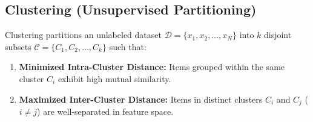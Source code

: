 \subsection{Clustering (Unsupervised Partitioning)}
Clustering partitions an unlabeled dataset $\mathcal{D} = \{x_1, x_2, \dots, x_N\}$ into $k$ disjoint subsets $\mathcal{C} = \{C_1, C_2, \dots, C_k\}$ such that:
\begin{enumerate}
    \item \textbf{Minimized Intra-Cluster Distance:} Items grouped within the same cluster $C_i$ exhibit high mutual similarity.
    \item \textbf{Maximized Inter-Cluster Distance:} Items in distinct clusters $C_i$ and $C_j$ ($i \neq j$) are well-separated in feature space.
\end{enumerate}


